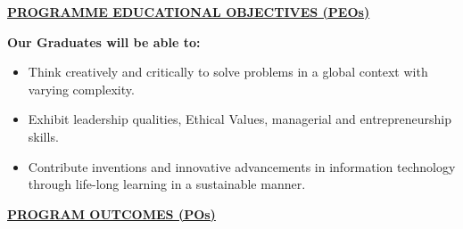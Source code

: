 \newpage
\begin{center}
    \textbf{\underline{PROGRAMME EDUCATIONAL OBJECTIVES (PEOs)}}
\end{center}
\vspace{0.5cm}

\noindent \textbf{Our Graduates will be able to:}
\begin{itemize}[leftmargin=2.5cm]
    \item[\textbf{PEO1:}] Think creatively and critically to solve problems in a global context with varying complexity.
    \item[\textbf{PEO2:}] Exhibit leadership qualities, Ethical Values, managerial and entrepreneurship skills.
    \item[\textbf{PEO3:}] Contribute inventions and innovative advancements in information technology through life-long learning in a sustainable manner.
\end{itemize}

\vspace{1cm}

\begin{center}
    \textbf{\underline{PROGRAM OUTCOMES (POs)}}
\end{center}
\vspace{0.5cm}

